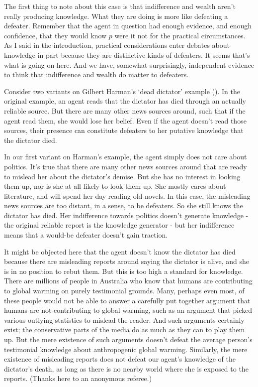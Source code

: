 \documentclass[
  11pt,
  letterpaper,
  DIV=11,
  numbers=noendperiod,
  oneside]{scrartcl}
\begin{document}
The first thing to note about this case is that indifference and wealth
aren't really producing knowledge. What they are doing is more like
defeating a defeater. Remember that the agent in question had enough
evidence, and enough confidence, that they would know \(p\) were it not
for the practical circumstances. As I said in the introduction,
practical considerations enter debates about knowledge in part because
they are distinctive kinds of defeaters. It seems that's what is going
on here. And we have, somewhat surprisingly, independent evidence to
think that indifference and wealth do matter to defeaters.

Consider two variants on Gilbert Harman's `dead dictator' example
(). In the original example,
an agent reads that the dictator has died through an actually reliable
source. But there are many other news sources around, such that if the
agent read them, she would lose her belief. Even if the agent doesn't
read those sources, their presence can constitute defeaters to her
putative knowledge that the dictator died.

In our first variant on Harman's example, the agent simply does not care
about politics. It's true that there are many other news sources around
that are ready to mislead her about the dictator's demise. But she has
no interest in looking them up, nor is she at all likely to look them
up. She mostly cares about literature, and will spend her day reading
old novels. In this case, the misleading news sources are too distant,
in a sense, to be defeaters. So she still knows the dictator has died.
Her indifference towards politics doesn't generate knowledge - the
original reliable report is the knowledge generator - but her
indifference means that a would-be defeater doesn't gain traction.

It might be objected here that the agent doesn't know the dictator has
died because there are misleading reports around saying the dictator is
alive, and she is in no position to rebut them. But this is too high a
standard for knowledge. There are millions of people in Australia who
know that humans are contributing to global warming on purely
testimonial grounds. Many, perhaps even most, of these people would not
be able to answer a carefully put together argument that humans are not
contributing to global warming, such as an argument that picked various
outlying statistics to mislead the reader. And such arguments certainly
exist; the conservative parts of the media do as much as they can to
play them up. But the mere existence of such arguments doesn't defeat
the average person's testimonial knowledge about anthropogenic global
warming. Similarly, the mere existence of misleading reports does not
defeat our agent's knowledge of the dictator's death, as long as there
is no nearby world where she is exposed to the reports. (Thanks here to
an anonymous referee.)
\end{document}
